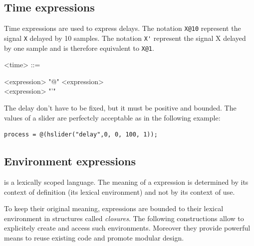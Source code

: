 \documentclass[a4paper,10pt]{book}
\begin{document}
\subsection{Time expressions}

Time expressions are used to express delays. The notation \lstinline'X@10' represent the signal \lstinline'X' delayed by 10 samples. The notation \lstinline"X'" represent the signal X delayed by one sample and is therefore equivalent to \lstinline'X@1'.

\begin{grammar}
  <time> ::= 
  \begin{syntdiag}
    \begin{stack}
      <expression> "@" <expression> \\ 
      <expression> "'"
    \end{stack}
  \end{syntdiag}
\end{grammar}

The delay don't have to be fixed, but it must be positive and bounded. The values of a slider are perfectcly acceptable as in the following example:

\begin{lstlisting}
process = @(hslider("delay",0, 0, 100, 1));
\end{lstlisting}

\subsection{Environment expressions}
\faust is a lexically scoped language. The meaning of a \faust expression is determined by its context of definition (its lexical environment) and not by its context of use. 

To keep their original meaning, \faust expressions are bounded to their lexical environment in structures called \textit{closures}. The following constructions allow to explicitely create and access such environments. Moreover they provide powerful means to reuse existing code and promote modular design.
\end{document}
